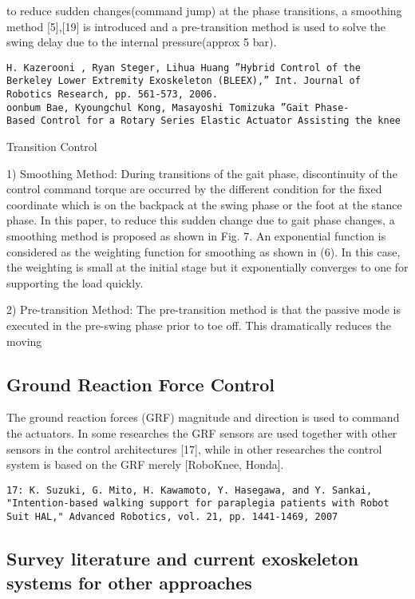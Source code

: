 \documentclass[letterpaper,12pt,fullpage]{article}
\begin{document}
to reduce
sudden changes(command jump) at the phase transitions, a
smoothing method [5],[19] is introduced and a pre-transition
method is used to solve the swing delay due to the internal
pressure(approx 5 bar).
\begin{verbatim}
H. Kazerooni , Ryan Steger, Lihua Huang ”Hybrid Control of the
Berkeley Lower Extremity Exoskeleton (BLEEX),” Int. Journal of
Robotics Research, pp. 561-573, 2006.
oonbum Bae, Kyoungchul Kong, Masayoshi Tomizuka ”Gait Phase-
Based Control for a Rotary Series Elastic Actuator Assisting the knee
\end{verbatim}

Transition Control

1) Smoothing Method: During transitions of the gait
phase, discontinuity of the control command torque are
occurred by the different condition for the fixed coordinate
which is on the backpack at the swing phase or the foot at
the stance phase. In this paper, to reduce this sudden change
due to gait phase changes, a smoothing method is proposed
as shown in Fig. 7. An exponential function is considered
as the weighting function for smoothing as shown in (6).
In this case, the weighting is small at the initial stage but
it exponentially converges to one for supporting the load
quickly.

2) Pre-transition Method: The pre-transition method is
that the passive mode is executed in the pre-swing phase
prior to toe off. This dramatically reduces the moving

\subsection{Ground Reaction Force Control}

The ground reaction
forces (GRF) magnitude and direction is used to command the
actuators. In some researches the GRF sensors are used
together with other sensors in the control architectures [17],
while in other researches the control system is based on the
GRF merely [RoboKnee, Honda].
\begin{verbatim}
17: K. Suzuki, G. Mito, H. Kawamoto, Y. Hasegawa, and Y. Sankai,
"Intention-based walking support for paraplegia patients with Robot
Suit HAL," Advanced Robotics, vol. 21, pp. 1441-1469, 2007
\end{verbatim}

\subsection{Survey literature and current exoskeleton systems for other approaches}
\end{document}
